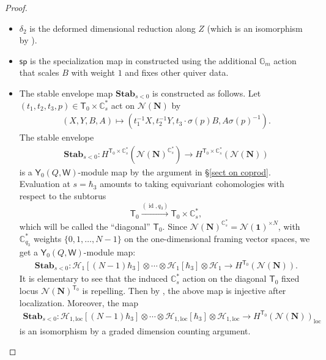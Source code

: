 \documentclass[10pt]{amsart}
\theoremstyle{definition}
\numberwithin{equation}{section}
\newcommand{\bC}{\mathbb{C}}
\newcommand{\bG}{\mathbb{G}}
\newcommand{\cH}{\mathcal{H}}
\newcommand{\cN}{\mathcal{N}}
\newcommand{\loc}{\mathrm{loc}}
\newcommand{\sT}{\mathsf{T}}
\newcommand{\sW}{\mathsf{W}}
\newcommand{\id}{\operatorname{id}}
\begin{document}
\begin{proof}
\begin{itemize}
\item $\delta_2$ is the deformed dimensional reduction along $Z$ (which is an isomorphism by \cite[Thm.~C.1]{COZZ}).

\item $\mathsf{sp}$ is the specialization map in \cite[\S 7.2]{COZZ} constructed using the additional $\bG_m$ action that scales $B$ with weight $1$ and fixes other quiver data.

\item The stable envelope map $\mathbf{Stab}_{s<0}$ is constructed as follows. Let $(t_1,t_2,t_3,p)\in \sT_0\times \bC^*_s$ act on $\cN(\mathbf N)$ by
\begin{align*}
    (X,Y,B,A)\mapsto (t_1^{-1}X,t_2^{-1}Y,t_3 \cdot\sigma(p)B,A\sigma(p)^{-1}).
\end{align*}
The stable envelope
\begin{align*}
    \mathbf{Stab}_{s<0}\colon H^{\sT_0\times \bC^*_s}(\cN(\mathbf N)^{\bC^*_s})\to H^{\sT_0\times \bC^*_s}(\cN(\mathbf N))
\end{align*}
is a $\mathsf Y_{0}(Q,\sW)$-module map by the argument in \S \ref{sect on coprod}. Evaluation at $s=\hbar_3$ amounts to taking equivariant cohomologies with respect to the subtorus $$\sT_0\xrightarrow{(\id,q_3)}\sT_0\times \bC^*_s, $$ which will be called the ``diagonal'' $\sT_0$. Since $\cN(\mathbf N)^{\bC^*_s}=\cN(\mathbf 1)^{\times N}$, with $\bC^*_{q_3}$ weights $\{0,1,\ldots,N-1\}$ on the one-dimensional framing vector spaces, 
we get a $\mathsf Y_{0}(Q,\sW)$-module map:
\begin{align*}
    \mathbf{Stab}_{s<0}\colon \cH_{1}[(N-1)\hbar_3]\otimes \cdots \otimes \cH_{1}[\hbar_3]\otimes \cH_{1}\to H^{\sT_0}(\cN(\mathbf N)).
\end{align*}
It is elementary to see that the induced $\bC^*_s$ action on the diagonal $\sT_0$ fixed locus $\cN(\mathbf N)^{\sT_0}$ is repelling. Then by \cite[Prop.~3.36]{COZZ}, the above map is injective after localization. Moreover, the map 
\begin{align*}
    \mathbf{Stab}_{s<0}\colon \cH_{1,\loc}[(N-1)\hbar_3]\otimes\cdots\otimes \cH_{1,\loc}[\hbar_3]\otimes \cH_{1,\loc}\to H^{\sT_0}(\cN(\mathbf N))_\loc
\end{align*}
is an isomorphism by a graded dimension counting argument.
\end{itemize}


\end{proof}
\end{document}
